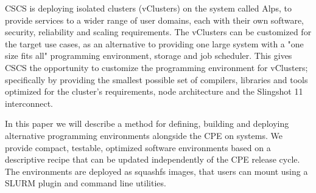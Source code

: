 CSCS is deploying isolated clusters (vClusters) on the \crayex system called Alps, to provide services to a wider range of user domains, each with their own software, security, reliability and scaling requirements.
The vClusters can be customized for the target use cases, as an alternative to providing one large system with a "one size fits all" programming environment, storage and job scheduler.
This gives CSCS the opportunity to customize the programming environment for vClusters; specifically by providing the smallest possible set of compilers, libraries and tools optimized for the cluster's requirements, node architecture and the Slingshot 11 interconnect.

In this paper we will describe a method for defining, building and deploying alternative programming environments alongside the CPE on \crayex systems.
We provide compact, testable, optimized software environments based on a descriptive recipe that can be updated independently of the CPE release cycle.
The environments are deployed as squashfs images, that users can mount using a SLURM plugin and command line utilities.

